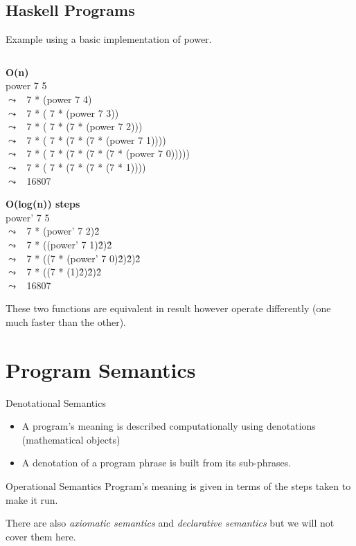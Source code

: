 \subsection{Haskell Programs}
Example using a basic implementation of power.
\inputminted{haskell}{introduction/code/power.hs}

\newcommand{\step}[1]{$\leadsto$ \ #1\\}

\begin{minipage}{.5\textwidth}
	\textbf{O(n)} \\
	power 7 5 \\
	\step{7 * (power 7 4)}
	\step{7 * ( 7 * (power 7 3))}
	\step{7 * ( 7 * (7 * (power 7 2)))}
	\step{7 * ( 7 * (7 * (7 * (power 7 1))))}
	\step{7 * ( 7 * (7 * (7 * (7 * (power 7 0)))))}
	\step{7 * ( 7 * (7 * (7 * (7 * 1))))}
	\step{16807}
\end{minipage} \begin{minipage}{.5\textwidth}
	\textbf{O(log(n)) steps} \\
	power' 7 5 \\
	\step{7 * (power' 7 2)\^2}
	\step{7 * ((power' 7 1)\^2)\^2}
	\step{7 * ((7 * (power' 7 0)\^2)\^2)\^2}
	\step{7 * ((7 * (1)\^2)\^2)\^2}
	\step{16807}
\end{minipage}

These two functions are equivalent in result however operate differently (one much faster than the other).

\section{Program Semantics}
\begin{definitionbox}{Denotational Semantics}
    \begin{itemize}
        \item A program's meaning is described computationally using denotations (mathematical objects)
        \item A denotation of a program phrase is built from its sub-phrases.
    \end{itemize}    
\end{definitionbox}
\begin{definitionbox}{Operational Semantics}
    Program's meaning is given in terms of the steps taken to make it run.
\end{definitionbox}

\noindent There are also \textit{axiomatic semantics} and \textit{declarative semantics} but we will not cover them here.
